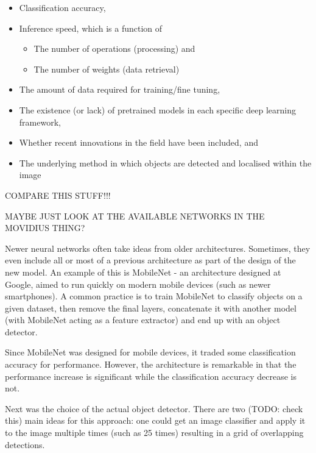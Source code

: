 \begin{itemize}
	\item Classification accuracy,
	\item Inference speed, which is a function of
	\begin{itemize}
		\item The number of operations (processing) and
		\item The number of weights (data retrieval)
	\end{itemize}
	\item The amount of data required for training/fine tuning,
	\item The existence (or lack) of pretrained models in each specific deep learning framework,
	\item Whether recent innovations in the field have been included, and
	\item The underlying method in which objects are detected and localised within the image
\end{itemize}

{\Large \color{red} COMPARE THIS STUFF!!! }

{\Large \color{red} MAYBE JUST LOOK AT THE AVAILABLE NETWORKS IN THE MOVIDIUS THING?}

Newer neural networks often take ideas from older architectures. Sometimes, they even include all or most of a previous architecture as part of the design of the new model. An example of this is MobileNet - an architecture designed at Google, aimed to run quickly on modern mobile devices (such as newer smartphones). A common practice is to train MobileNet to classify objects on a given dataset, then remove the final layers, concatenate it with another model (with MobileNet acting as a feature extractor) and end up with an object detector.

Since MobileNet was designed for mobile devices, it traded some classification accuracy for performance. However, the architecture is remarkable in that the performance increase is significant while the classification accuracy decrease is not.

Next was the choice of the actual object detector. There are two (TODO: check this) main ideas for this approach: one could get an image classifier and apply it to the image multiple times (such as 25 times) resulting in a grid of overlapping detections.
